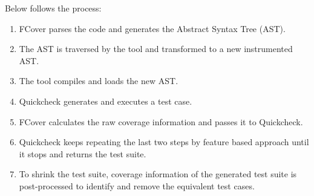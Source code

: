 \documentclass[12pt,a4paper]{report}
\begin{document}
Below follows the process:
\begin{enumerate}
 \item FCover parses the code and generates the Abstract Syntax Tree (AST).
 \item The AST is traversed by the tool and transformed to a new instrumented AST.
 \item The tool compiles and loads the new AST.
 \item Quickcheck generates and executes a test case.
 \item FCover calculates the raw coverage information and passes it to Quickcheck.
 \item Quickcheck keeps repeating the last two steps by feature based approach until it stops and returns the test suite.  
 \item To shrink the test suite, coverage information of the generated test suite is post-processed to identify and remove the equivalent test cases.
\end{enumerate}
\newpage
{}


\end{document}
